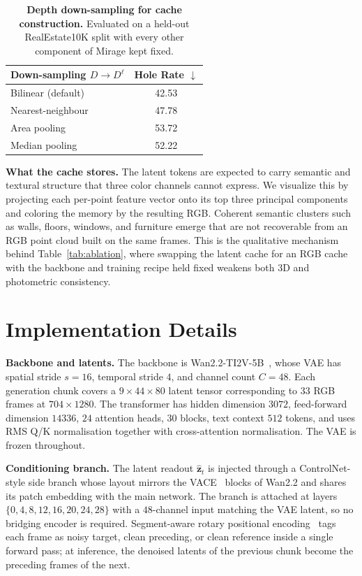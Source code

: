 \documentclass{llmxive}
\providecommand{\method}{Mirage\xspace}
\providecommand{\boldstart}[1]{\vspace{0.1in}\noindent\textbf{#1}}
\begin{document}
\begin{table}[t]
    \centering
    \begin{tabular}{lc}
    \toprule
    Down-sampling $D \to D^{\ell}$ & Hole Rate $\downarrow$ \\
    \midrule
    Bilinear (default) & 42.53 \\
    Nearest-neighbour  & 47.78 \\
    Area pooling       & 53.72 \\
    Median pooling     & 52.22 \\
    \bottomrule
    \end{tabular}
\caption{\textbf{Depth down-sampling for cache construction.} Evaluated on a held-out RealEstate10K split with every other component of \method{} kept fixed.}
\label{tab:depth_down}
\end{table}

\boldstart{What the cache stores.}
The latent tokens are expected to carry semantic and textural structure that three color channels cannot express.
We visualize this by projecting each per-point feature vector onto its top three principal components and coloring the memory by the resulting RGB.
Coherent semantic clusters such as walls, floors, windows, and furniture emerge that are not recoverable from an RGB point cloud built on the same frames.
This is the qualitative mechanism behind Table~\ref{tab:ablation}, where swapping the latent cache for an RGB cache with the backbone and training recipe held fixed weakens both 3D and photometric consistency.


\section{Implementation Details}
\label{sec:app_implementation}

\boldstart{Backbone and latents.}
The backbone is Wan2.2-TI2V-5B~\cite{wan2025wan}, whose VAE has spatial stride $s = 16$, temporal stride $4$, and channel count $C = 48$.
Each generation chunk covers a $9 \times 44 \times 80$ latent tensor corresponding to $33$ RGB frames at $704 \times 1280$.
The transformer has hidden dimension $3072$, feed-forward dimension $14336$, $24$ attention heads, $30$ blocks, text context $512$ tokens, and uses RMS Q/K normalisation together with cross-attention normalisation.
The VAE is frozen throughout.

\boldstart{Conditioning branch.}
The latent readout $\hat{\mathbf{z}}_t$ is injected through a ControlNet-style side branch whose layout mirrors the VACE~\cite{jiang2025vace} blocks of Wan2.2 and shares its patch embedding with the main network.
The branch is attached at layers $\{0, 4, 8, 12, 16, 20, 24, 28\}$ with a $48$-channel input matching the VAE latent, so no bridging encoder is required.
Segment-aware rotary positional encoding~\cite{su2024roformer} tags each frame as noisy target, clean preceding, or clean reference inside a single forward pass; at inference, the denoised latents of the previous chunk become the preceding frames of the next.
\end{document}
